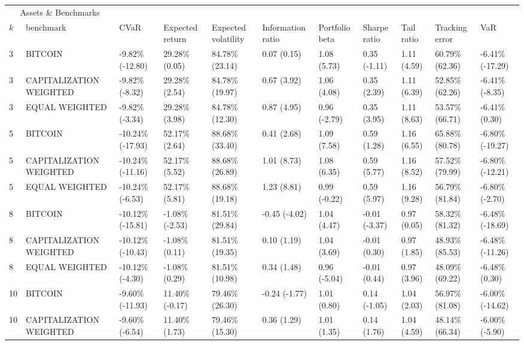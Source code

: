 \documentclass{article}
\begin{document}
\begin{landscape}
\begin{table}[H]
  \centering
  \begin{tabular}{p{0.4cm}|p{3cm}|p{1.65cm}|p{1.65cm}|p{1.65cm}|p{1.65cm}|p{1.65cm}|p{1.65cm}|p{1.65cm}|p{1.65cm}|p{1.65cm}}%
    \toprule
    \multicolumn{2}{c}{Assets \& Benchmarks}                   \\
    \cmidrule(r){1-2}
    $k$ & benchmark & CVaR & Expected return & Expected volatility&Information ratio&Portfolio beta&Sharpe ratio&Tail ratio&Tracking error&VaR\\
    \midrule

3&BITCOIN&-9.82\% (-12.80)&29.28\% (0.05)&84.78\% (23.14)&0.07 (0.15)&1.08 (5.73)&0.35 (-1.11)&1.11 (4.59)&60.79\% (62.36)&-6.41\% (-17.29)
\\ 
3&CAPITALIZATION WEIGHTED&-9.82\% (-8.32)&29.28\% (2.54)&84.78\% (19.97)&0.67 (3.92)&1.06 (4.08)&0.35 (2.39)&1.11 (6.39)&52.85\% (62.26)&-6.41\% (-8.35)
\\ 
3&EQUAL WEIGHTED&-9.82\% (-3.34)&29.28\% (3.98)&84.78\% (12.30)&0.87 (4.95)&0.96 (-2.79)&0.35 (3.95)&1.11 (8.63)&53.57\% (66.71)&-6.41\% (0.30)
\\ 
5&BITCOIN&-10.24\% (-17.93)&52.17\% (2.64)&88.68\% (33.40)&0.41 (2.68)&1.09 (7.58)&0.59 (1.28)&1.16 (6.55)&65.88\% (80.78)&-6.80\% (-19.27)
\\ 
5&CAPITALIZATION WEIGHTED&-10.24\% (-11.16)&52.17\% (5.52)&88.68\% (26.89)&1.01 (8.73)&1.08 (6.35)&0.59 (5.77)&1.16 (8.52)&57.52\% (79.99)&-6.80\% (-12.21)
\\ 
5&EQUAL WEIGHTED&-10.24\% (-6.53)&52.17\% (5.81)&88.68\% (19.18)&1.23 (8.81)&0.99 (-0.22)&0.59 (5.97)&1.16 (9.28)&56.79\% (81.84)&-6.80\% (-2.70)
\\ 
8&BITCOIN&-10.12\% (-15.81)&-1.08\% (-2.53)&81.51\% (29.84)&-0.45 (-4.02)&1.04 (4.47)&-0.01 (-3.37)&0.97 (0.05)&58.32\% (81.32)&-6.48\% (-18.69)
\\ 
8&CAPITALIZATION WEIGHTED&-10.12\% (-10.43)&-1.08\% (0.11)&81.51\% (19.35)&0.10 (1.19)&1.04 (3.69)&-0.01 (0.30)&0.97 (1.85)&48.93\% (85.53)&-6.48\% (-11.26)
\\ 
8&EQUAL WEIGHTED&-10.12\% (-4.30)&-1.08\% (0.29)&81.51\% (10.98)&0.34 (1.48)&0.96 (-5.04)&-0.01 (0.44)&0.97 (3.96)&48.09\% (69.22)&-6.48\% (0.30)
\\ 
10&BITCOIN&-9.60\% (-11.93)&11.40\% (-0.17)&79.46\% (26.30)&-0.24 (-1.77)&1.01 (0.80)&0.14 (-1.05)&1.04 (2.03)&56.97\% (81.08)&-6.00\% (-14.62)
\\ 
10&CAPITALIZATION WEIGHTED&-9.60\% (-6.54)&11.40\% (1.73)&79.46\% (15.30)&0.36 (1.29)&1.01 (1.35)&0.14 (1.76)&1.04 (4.59)&48.14\% (66.34)&-6.00\% (-5.90)

\end{tabular}
\end{table}
\end{landscape}
\end{document}
